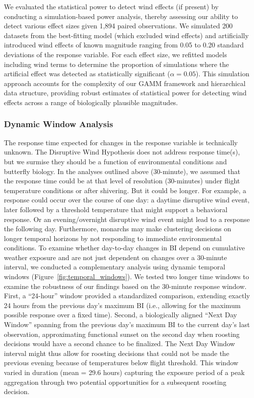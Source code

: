 \documentclass[insects,article,submit,pdftex,moreauthors]{Definitions/mdpi}
\begin{document}
We evaluated the statistical power to detect wind effects (if present) by conducting a simulation-based power analysis, thereby assessing our ability to detect various effect sizes given 1,894 paired observations. We simulated 200 datasets from the best-fitting model (which excluded wind effects) and artificially introduced wind effects of known magnitude ranging from 0.05 to 0.20 standard deviations of the response variable. For each effect size, we refitted models including wind terms to determine the proportion of simulations where the artificial effect was detected as statistically significant ($\alpha = 0.05$). This simulation approach accounts for the complexity of our GAMM framework and hierarchical data structure, providing robust estimates of statistical power for detecting wind effects across a range of biologically plausible magnitudes.

\subsubsection{Dynamic Window Analysis}

The response time expected for changes in the response variable is technically unknown. The Disruptive Wind Hypothesis does not address response time(s), but we surmise they should be a function of environmental conditions and butterfly biology. In the analyses outlined above (30-minute), we assumed that the response time could be at that level of resolution (30-minutes) under flight temperature conditions or after shivering. But it could be longer. For example, a response could occur over the course of one day: a daytime disruptive wind event, later followed by a threshold temperature that might support a behavioral response. Or an evening/overnight disruptive wind event might lead to a response the following day. Furthermore, monarchs may make clustering decisions on longer temporal horizons by not responding to immediate environmental conditions. To examine whether day-to-day changes in BI depend on cumulative weather exposure and are not just dependent on changes over a 30-minute interval, we conducted a complementary analysis using dynamic temporal windows (Figure~\ref{fig:temporal_windows}). We tested two longer time windows to examine the robustness of our findings based on the 30-minute response window. First, a ``24-hour'' window provided a standardized comparison, extending exactly 24 hours from the previous day's maximum BI (i.e., allowing for the maximum possible response over a fixed time). Second, a biologically aligned ``Next Day Window'' spanning from the previous day's maximum BI to the current day's last observation, approximating functional sunset on the second day when roosting decisions would have a second chance to be finalized. The Next Day Window interval might thus allow for roosting decisions that could not be made the previous evening because of temperatures below flight threshold. This window varied in duration (mean = 29.6 hours) capturing the exposure period of a peak aggregation through two potential opportunities for a subsequent roosting decision.
\end{document}
